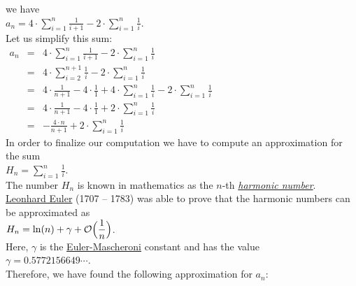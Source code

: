 we have
\\[0.2cm]
\hspace*{1.3cm}
$\displaystyle a_{n} = 4 \cdot \sum\limits_{i=1}^n \frac{1}{i+1} - 2 \cdot \sum\limits_{i=1}^n \frac{1}{i}$.  
\\[0.2cm]
Let us simplify this sum:
\\[0.2cm]
\hspace*{1.3cm}
$
\begin{array}{lcl}
 a_{n} & = & \displaystyle 4 \cdot \sum_{i=1}^n \frac{1}{i+1} - 2 \cdot \sum_{i=1}^n \frac{1}{i} \\[0.5cm]
       & = & \displaystyle 4 \cdot \sum_{i=2}^{n+1} \frac{1}{i} - 2 \cdot \sum_{i=1}^n \frac{1}{i} \\[0.5cm]
       & = & \displaystyle 4 \cdot \frac{1}{n+1} - 4 \cdot \frac{1}{1} + 4 \cdot \sum_{i=1}^{n} \frac{1}{i} - 2 \cdot \sum_{i=1}^n \frac{1}{i} \\[0.5cm]
       & = & \displaystyle 4 \cdot \frac{1}{n+1} - 4 \cdot \frac{1}{1} + 2 \cdot \sum_{i=1}^{n} \frac{1}{i}  \\[0.5cm]
       & = & \displaystyle - \frac{4 \cdot n}{n+1}  + 2 \cdot \sum_{i=1}^{n} \frac{1}{i}  
\end{array}
$
\\[0.2cm]
In order to finalize our computation we have to compute an approximation for the sum
\\[0.2cm]
\hspace*{1.3cm}
$H_n = \displaystyle\sum\limits_{i=1}^{n}\frac{1}{i}$.
\\[0.2cm] 
The number $H_n$ is known in mathematics as the $n$-th 
\href{http://en.wikipedia.org/wiki/Harmonic_number}{\emph{harmonic number}}.
\href{http://en.wikipedia.org/wiki/Leonhard_Euler}{Leonhard Euler} (1707 -- 1783) was able to prove
that the harmonic numbers can be approximated as
\\[0.2cm]
\hspace*{1.3cm}
$\displaystyle H_n = \ln(n) + \gamma + \mathcal{O}\Bigl(\frac{1}{n}\Bigr)$. 
\\[0.2cm]  
Here, $\gamma$ is the
\href{http://en.wikipedia.org/wiki/Euler-Mascheroni_constant}{Euler-Mascheroni} constant and has the
value
\\[0.2cm]
\hspace*{1.3cm}
$\gamma = 0.5772156649 \cdots$.
\\[0.2cm]
Therefore, we have found the following approximation for $a_n$:
\\[0.2cm]
\hspace*{1.3cm}
